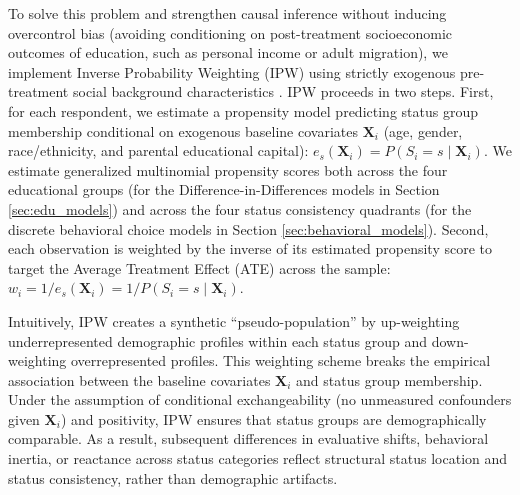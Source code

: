 \documentclass[12pt, letterpaper]{article}
\begin{document}
To solve this problem and strengthen causal inference without inducing overcontrol bias (avoiding conditioning on post-treatment socioeconomic outcomes of education, such as personal income or adult migration), we implement Inverse Probability Weighting (IPW) using strictly exogenous pre-treatment social background characteristics \citep{rosenbaum1983central}. IPW proceeds in two steps. First, for each respondent, we estimate a propensity model predicting status group membership conditional on exogenous baseline covariates $\mathbf{X}_i$ (age, gender, race/ethnicity, and parental educational capital): $e_s(\mathbf{X}_i) = P(S_i = s \mid \mathbf{X}_i)$. We estimate generalized multinomial propensity scores both across the four educational groups (for the Difference-in-Differences models in Section \ref{sec:edu_models}) and across the four status consistency quadrants (for the discrete behavioral choice models in Section \ref{sec:behavioral_models}). Second, each observation is weighted by the inverse of its estimated propensity score to target the Average Treatment Effect (ATE) across the sample: $w_i = 1 / e_s(\mathbf{X}_i) = 1 / P(S_i = s \mid \mathbf{X}_i)$.

Intuitively, IPW creates a synthetic ``pseudo-population'' by up-weighting underrepresented demographic profiles within each status group and down-weighting overrepresented profiles. This weighting scheme breaks the empirical association between the baseline covariates $\mathbf{X}_i$ and status group membership. Under the assumption of conditional exchangeability (no unmeasured confounders given $\mathbf{X}_i$) and positivity, IPW ensures that status groups are demographically comparable. As a result, subsequent differences in evaluative shifts, behavioral inertia, or reactance across status categories reflect structural status location and status consistency, rather than demographic artifacts.
\end{document}
